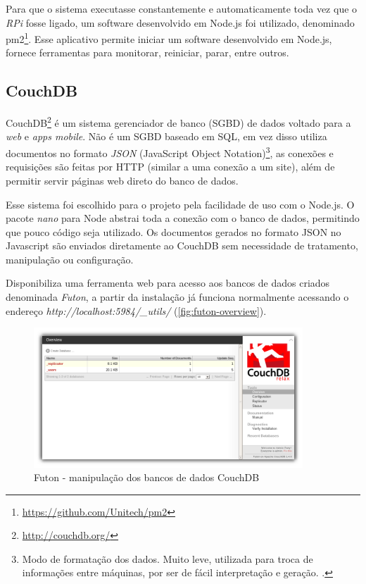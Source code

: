 Para que o sistema executasse constantemente e automaticamente toda vez que o \textit{RPi} fosse ligado, um software desenvolvido em Node.js foi utilizado, denominado pm2\footnote{\url{https://github.com/Unitech/pm2}}. Esse aplicativo permite iniciar um software desenvolvido em Node.js, fornece ferramentas para monitorar, reiniciar, parar, entre outros.

\subsection{CouchDB}\label{sec:couchdb}

CouchDB\footnote{\url{http://couchdb.org/}} é um sistema gerenciador de banco (SGBD) de dados voltado para a \textit{web} e \textit{apps mobile}. Não é um SGBD baseado em SQL, em vez disso utiliza documentos no formato \textit{JSON} (JavaScript Object Notation)\footnote{Modo de formatação dos dados. Muito leve, utilizada para troca de informações entre máquinas, por ser de fácil interpretação e geração. \cite{json-couch}.}, as conexões e requisições são feitas por HTTP (similar a uma conexão a um site), além de permitir servir páginas web direto do banco de dados.

Esse sistema foi escolhido para o projeto pela facilidade de uso com o Node.js. O pacote \textit{nano} para Node abstrai toda a conexão com o banco de dados, permitindo que pouco código seja utilizado. Os documentos gerados no formato JSON no Javascript são enviados diretamente ao CouchDB sem necessidade de tratamento, manipulação ou configuração.

Disponibiliza uma ferramenta web para acesso aos bancos de dados criados denominada \textit{Futon}, a partir da instalação já funciona normalmente acessando o endereço \textit{http://localhost:5984/\_utils/} (\autoref{fig:futon-overview}).

\begin{figure}[htb]
	\caption{\label{fig:futon-overview}Futon - manipulação dos bancos de dados CouchDB}
	\begin{center}
		\includegraphics[width=0.9\textwidth]{img/futon-overview.png}
	\end{center}
\end{figure}

